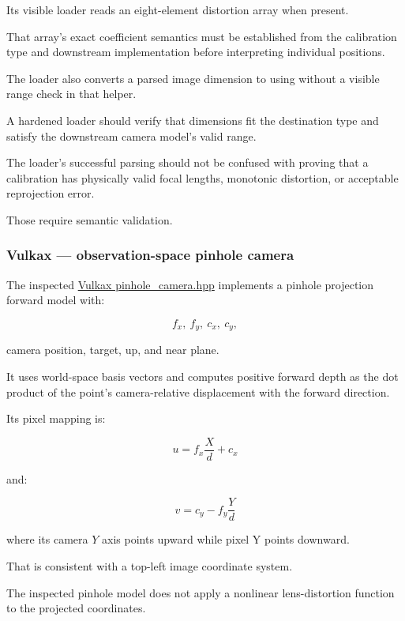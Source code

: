 Its visible loader reads an eight-element distortion array when present.

That array's exact coefficient semantics must be established from the calibration type and downstream implementation before interpreting individual positions.

The loader also converts a parsed  image dimension to  using  without a visible range check in that helper.

A hardened loader should verify that dimensions fit the destination type and satisfy the downstream camera model's valid range.

The loader's successful parsing should not be confused with proving that a calibration has physically valid focal lengths, monotonic distortion, or acceptable reprojection error.

Those require semantic validation.

\subsubsection{Vulkax --- observation-space pinhole camera}\label{02-foundations-ii-ch037-vulkax-observation-space-pinhole-camera}

\hypertarget{02-foundations-ii-ch037-vulkax-observation-space-pinhole-camera}{}

The inspected \href{https://github.com/swayam8624/Vulkax/blob/main/include/vulkax/world/pinhole_camera.hpp?utm_source=chatgpt.com}{Vulkax pinhole\_camera.hpp} implements a pinhole projection forward model with:

\[
 f_x,\ f_y,\ c_x,\ c_y,
\]

camera position, target, up, and near plane.

It uses world-space basis vectors and computes positive forward depth as the dot product of the point's camera-relative displacement with the forward direction.

Its pixel mapping is:

\[
 \boxed{ u=f_x\frac{X}{d}+c_x }
\]

and:

\[
 \boxed{ v=c_y-f_y\frac{Y}{d} }
\]

where its camera \(Y\) axis points upward while pixel Y points downward.

That is consistent with a top-left image coordinate system.

The inspected pinhole model does not apply a nonlinear lens-distortion function to the projected coordinates.

